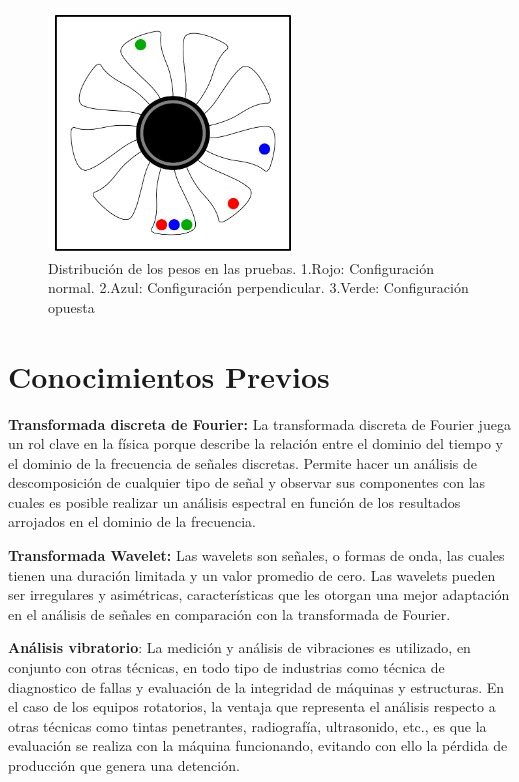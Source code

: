 \documentclass[11pt,a4paper]{article}
\begin{document}
\begin{figure}
	\centering
	\includegraphics[scale=1]{weight_distr}
	\caption{Distribución de los pesos en las pruebas. 1.Rojo: Configuración normal. 2.Azul: Configuración perpendicular. 3.Verde: Configuración opuesta}
\end{figure}

\section{Conocimientos Previos}
\textbf{Transformada discreta de Fourier:} La transformada discreta de Fourier juega un rol clave en la física porque describe la relación entre el dominio del tiempo y el dominio de la frecuencia de señales discretas\cite{fourier}. Permite hacer un análisis de descomposición de cualquier tipo de señal y observar sus componentes con las cuales es posible realizar un análisis espectral en función de los resultados arrojados en el dominio de la frecuencia.

\textbf{Transformada Wavelet:} Las wavelets son señales, o formas de onda, las cuales tienen una duración limitada y un valor promedio de cero. Las wavelets pueden ser irregulares y asimétricas, características que les otorgan una mejor adaptación en el análisis de señales en comparación con la transformada de Fourier.\cite{intar}

\textbf{Análisis vibratorio}: La medición y análisis de vibraciones es utilizado, en conjunto con otras técnicas, en todo tipo de industrias como técnica de diagnostico de fallas y evaluación de la integridad de máquinas y estructuras. En el caso de los equipos rotatorios, la ventaja que representa el análisis respecto a otras técnicas como tintas penetrantes, radiografía, ultrasonido, etc., es que la evaluación se realiza con la máquina funcionando, evitando con ello la pérdida de producción que genera una detención\cite{analisis_vibr}.
\end{document}
